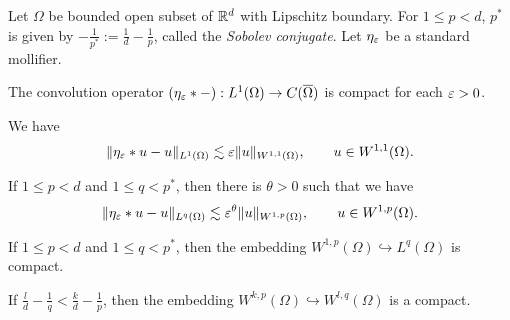 \documentclass{../../large}
\begin{document}
\begin{prb}
Let $\Omega$ be bounded open subset of $\mathbb{R}^d$ with Lipschitz boundary.
For $1\le p<d$, $p^*$ is given by $-\frac1{p^*}:=\frac1d-\frac1p$, called the \emph{Sobolev conjugate}.
Let $\eta_\varepsilon$ be a standard mollifier.
\begin{parts}
\item The convolution operator $(\eta_\varepsilon*-):L^1(\Omega)\to C(\overline\Omega)$ is compact for each $\varepsilon>0$.
\item We have
\[\|\eta_\varepsilon*u-u\|_{L^1(\Omega)}\lesssim\varepsilon\|u\|_{W^{1,1}(\Omega)},\qquad u\in W^{1,1}(\Omega).\]
\item If $1\le p<d$ and $1\le q<p^*$, then there is $\theta>0$ such that we have
\[\|\eta_\varepsilon*u-u\|_{L^q(\Omega)}\lesssim\varepsilon^\theta\|u\|_{W^{1,p}(\Omega)},\qquad u\in W^{1,p}(\Omega).\]
\item If $1\le p<d$ and $1\le q<p^*$, then the embedding $W^{1,p}(\Omega)\hookrightarrow L^q(\Omega)$ is compact.
\item If $\frac ld-\frac1q<\frac kd-\frac1p$, then the embedding $W^{k,p}(\Omega)\hookrightarrow W^{l,q}(\Omega)$ is a compact.
\end{parts}
\end{prb}
\end{document}
